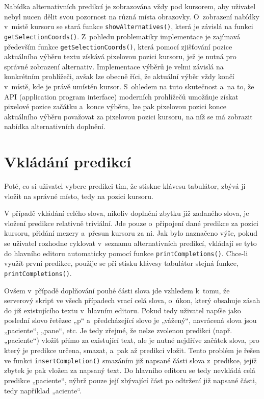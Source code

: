 \documentclass[a4paper,11pt,openany]{book} %
\begin{document}
Nabídka alternativních predikcí je zobrazována vždy pod kursorem, aby uživatel nebyl nucen dělit svou pozornost na různá místa obrazovky. O~zobrazení nabídky v~místě kursoru se stará funkce {\tt show\-Alternatives()}, která je závislá na funkci {\tt get\-Selection\-Coords()}. Z~pohledu problematiky implementace je zajímavá především funkce {\tt get\-Selection\-Coords()}, která pomocí zjišťování pozice aktuálního výběru textu získává pixelovou pozici kursoru, jež je nutná pro správné zobrazení alternativ. Implementace výběrů je velmi závislá na konkrétním prohlížeči, avšak lze obecně říci, že aktuální výběr vždy končí v~místě, kde je právě umístěn kursor. S~ohledem na tuto skutečnost a~na to, že API (application program interface) moderních prohlížečů umožňuje získat pixelové pozice začátku a~konce výběru, lze pak pixelovou pozici konce aktuálního výběru považovat za pixelovou pozici kursoru, na níž se má zobrazit nabídka alternativních doplnění. 

\section{Vkládání predikcí}

Poté, co si uživatel vybere predikci tím, že stiskne klávesu tabulátor, zbývá ji vložit na správné místo, tedy na pozici kursoru.

V případě vkládání celého slova, nikoliv doplnění zbytku již zadaného slova, je vložení predikce relativně triviální. Jde pouze o~připojení dané predikce za pozici kursoru, přidání mezery a~přesun kursoru za ni. Jak bylo naznačeno výše, pokud se uživatel rozhodne cyklovat v~seznamu alternativních predikcí, vkládají se tyto do hlavního editoru automaticky pomocí funkce {\tt printCompletions()}. Chce-li využít první predikce, použije se při stisku klávesy tabulátor stejná funkce, {\tt printCompletions()}. 

Ovšem v~případě doplňování pouhé části slova jde vzhledem k~tomu, že serverový skript ve všech případech vrací celá slova, o~úkon, který obsahuje zásah do již existujícího textu v~hlavním editoru. Pokud tedy uživatel napíše jako poslední slovo řetězec „p“ a~předcházející slovo je „vážený“, navrácená slova jsou „paciente“, „pane“, etc. Je tedy zřejmé, že nelze zvolenou predikci (např. „paciente“) vložit přímo za existující text, ale je nutné nejdříve začátek slova, pro který je predikce určena, smazat, a~pak až predikci vložit. Tento problém je řešen ve funkci {\tt insertCompletion()} smazáním již napsané části slova z~predikce, jejíž zbytek je pak vložen za napsaný text. Do hlavního editoru se tedy nevkládá celá predikce „paciente“, nýbrž pouze její zbývající část po odtržení již napsané části, tedy například „aciente“.
\end{document}
